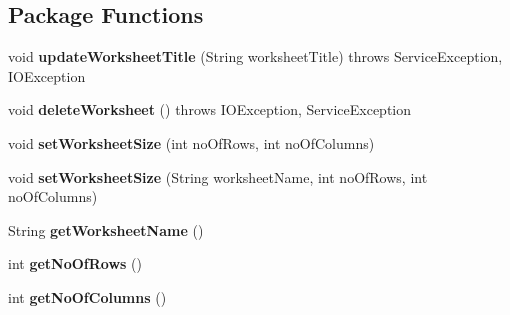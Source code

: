 \subsection*{Package Functions}
\begin{DoxyCompactItemize}
\item 
\hypertarget{classcom_1_1zeuslearning_1_1automation_1_1io_1_1GoogleSpreadsheet_ac18de416b0670b91e009354c077095d0}{}\label{classcom_1_1zeuslearning_1_1automation_1_1io_1_1GoogleSpreadsheet_ac18de416b0670b91e009354c077095d0} 
void {\bfseries update\+Worksheet\+Title} (String worksheet\+Title)  throws Service\+Exception, I\+O\+Exception 
\item 
\hypertarget{classcom_1_1zeuslearning_1_1automation_1_1io_1_1GoogleSpreadsheet_a09b1426e25e02c28aa3cb3bf9f12a393}{}\label{classcom_1_1zeuslearning_1_1automation_1_1io_1_1GoogleSpreadsheet_a09b1426e25e02c28aa3cb3bf9f12a393} 
void {\bfseries delete\+Worksheet} ()  throws I\+O\+Exception, Service\+Exception 
\item 
\hypertarget{classcom_1_1zeuslearning_1_1automation_1_1io_1_1GoogleSpreadsheet_a31e5646d30864769b4955e948a8afebe}{}\label{classcom_1_1zeuslearning_1_1automation_1_1io_1_1GoogleSpreadsheet_a31e5646d30864769b4955e948a8afebe} 
void {\bfseries set\+Worksheet\+Size} (int no\+Of\+Rows, int no\+Of\+Columns)
\item 
\hypertarget{classcom_1_1zeuslearning_1_1automation_1_1io_1_1GoogleSpreadsheet_aff24fdecf1f0e0a4e19e2439255be1a1}{}\label{classcom_1_1zeuslearning_1_1automation_1_1io_1_1GoogleSpreadsheet_aff24fdecf1f0e0a4e19e2439255be1a1} 
void {\bfseries set\+Worksheet\+Size} (String worksheet\+Name, int no\+Of\+Rows, int no\+Of\+Columns)
\item 
\hypertarget{classcom_1_1zeuslearning_1_1automation_1_1io_1_1GoogleSpreadsheet_a5b039414132e2accf9b2a706cd66b386}{}\label{classcom_1_1zeuslearning_1_1automation_1_1io_1_1GoogleSpreadsheet_a5b039414132e2accf9b2a706cd66b386} 
String {\bfseries get\+Worksheet\+Name} ()
\item 
\hypertarget{classcom_1_1zeuslearning_1_1automation_1_1io_1_1GoogleSpreadsheet_a759cb43b5f0a073d675a651e38683987}{}\label{classcom_1_1zeuslearning_1_1automation_1_1io_1_1GoogleSpreadsheet_a759cb43b5f0a073d675a651e38683987} 
int {\bfseries get\+No\+Of\+Rows} ()
\item 
\hypertarget{classcom_1_1zeuslearning_1_1automation_1_1io_1_1GoogleSpreadsheet_ae6e67182fde7fe29f54265a4f358970b}{}\label{classcom_1_1zeuslearning_1_1automation_1_1io_1_1GoogleSpreadsheet_ae6e67182fde7fe29f54265a4f358970b} 
int {\bfseries get\+No\+Of\+Columns} ()
\end{DoxyCompactItemize}
